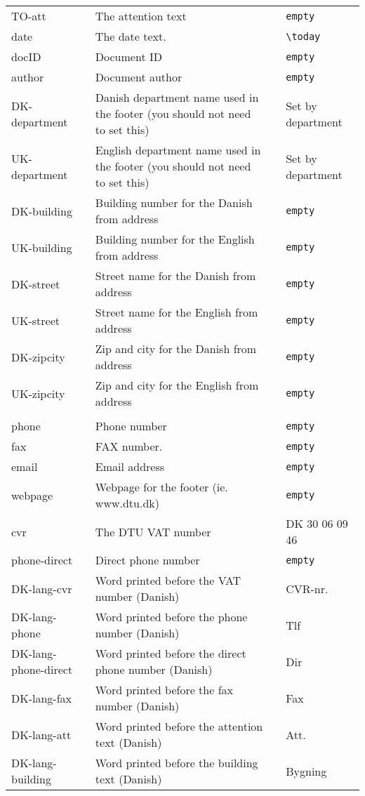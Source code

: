 \documentclass{dtuletter}
\newcommand{\optempty}{{\rmfamily\texttt{empty}}}
\begin{document}
\begin{longtable}{@{}>{\ttfamily}lp{75mm}>{\ttfamily}l>{}p{30mm}@{}}
TO-att		& The attention text & & \optempty\\
date 		& The date text. & & \verb,\today,\\
docID  		& Document ID & & \optempty\\
author 		& Document author & &\optempty\\
%
DK-department 	& Danish department name used in the footer (you should not need to set this) & & Set by department  \\
UK-department 	& English department name used in the footer (you should not need to set this) & & Set by department  \\
DK-building 	& Building number for the Danish from address & &\optempty\\
UK-building 	& Building number for the English from address & &\optempty\\
DK-street 		& Street name for the Danish from address & &\optempty\\
UK-street 		& Street name for the English from address & &\optempty\\
DK-zipcity 		& Zip and city for the Danish from address & &\optempty\\
UK-zipcity 		& Zip and city for the English from address & &\optempty\\\\
phone			& Phone number & & \optempty\\
fax				& FAX number. & & \optempty\\
email 			& Email address & & \optempty\\
webpage			& Webpage for the footer (ie. www.dtu.dk) & & \optempty\\
cvr 			& The DTU VAT number & & DK 30 06 09 46\\
phone-direct	& Direct phone number & & \optempty\\
%
%
DK-lang-cvr 			& Word printed before the VAT number (Danish) 			& & CVR-nr.  \\
DK-lang-phone 			& Word printed before the phone number (Danish) 		& & Tlf      \\
DK-lang-phone-direct 	& Word printed before the direct phone number (Danish) 	& & Dir      \\
DK-lang-fax 			& Word printed before the fax number (Danish)			& & Fax      \\
DK-lang-att 			& Word printed before the attention text (Danish)		& & Att.     \\
DK-lang-building 		& Word printed before the building text (Danish)		& & Bygning  \\

\end{longtable}
\end{document}
